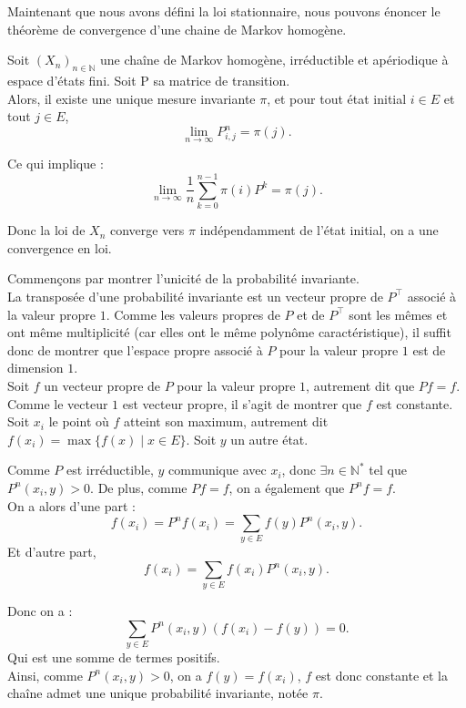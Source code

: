 \documentclass{article}
\begin{document}
Maintenant que nous avons défini la loi stationnaire, nous pouvons énoncer le théorème de convergence d'une chaine de Markov homogène. \\

\begin{tcolorbox}[colback=white,colframe=red!80!black,title=Théorème de convergence]
Soit $(X_n)_{n \in \mathbb{N}}$ une chaîne de Markov homogène, irréductible et apériodique à espace d'états fini. Soit P sa matrice de transition.\\
Alors, il existe une unique mesure invariante $\pi$, et pour tout état initial $i \in E$ et tout $j \in E$,
\[
\lim_{n \to \infty} P^n_{i,j} = \pi(j).
\]

Ce qui implique :
\[
\lim_{n \to \infty} \frac{1}{n} \sum_{k=0}^{n-1} \pi(i) P^k = \pi(j).
\]

Donc la loi de $X_n$ converge vers $\pi$ indépendamment de l'état initial, on a une convergence en loi.
\end{tcolorbox}

\begin{tcolorbox}[colback=white, colframe=green!80!black, title=Démonstration, breakable]
Commençons par montrer l'unicité de la probabilité invariante. \\

La transposée d'une probabilité invariante est un vecteur propre de $P^{\top}$ associé à la valeur propre $1$.
Comme les valeurs propres de $P$ et de $P^{\top}$ sont les mêmes et ont même multiplicité (car elles ont le même polynôme caractéristique), il suffit donc de montrer que l'espace propre associé à $P$ pour la valeur propre $1$ est de dimension $1$. \\

Soit $f$ un vecteur propre de $P$ pour la valeur propre $1$, autrement dit que $Pf = f$. Comme le vecteur $1$ est vecteur propre, il s'agit de montrer que $f$ est constante. \\

Soit $x_i$ le point où $f$ atteint son maximum, autrement dit $f(x_i) = \max\{f(x) \mid x \in E\}$. Soit $y$ un autre état.

Comme $P$ est irréductible, $y$ communique avec $x_i$, donc $\exists n \in \mathbb{N}^{*}$ tel que $P^n(x_i, y) > 0$. De plus, comme $Pf = f$, on a également que $P^n f = f$. \\

On a alors d'une part :
\[
f(x_i) = P^n f(x_i) = \sum_{y \in E} f(y) P^n(x_i, y).
\]
Et d'autre part,
\[
f(x_i) = \sum_{y \in E} f(x_i) P^n(x_i, y).
\]

Donc on a :
\[
\sum_{y \in E} P^n(x_i, y) \left(f(x_i) - f(y)\right) = 0.
\]
Qui est une somme de termes positifs. \\

Ainsi, comme $P^n(x_i, y) > 0$, on a $f(y) = f(x_i)$, $f$ est donc constante et la chaîne admet une unique probabilité invariante, notée $\pi$.
\end{tcolorbox}
\end{document}
